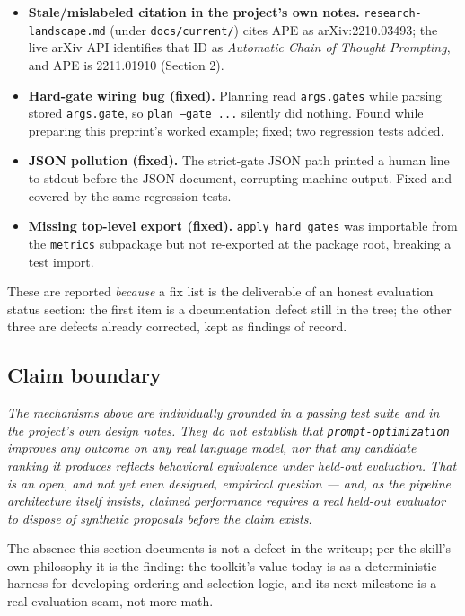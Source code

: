 \begin{itemize}[leftmargin=*]
  \item \textbf{Stale/mislabeled citation in the project's own notes.}
  \texttt{research-landscape.md} (under \texttt{docs/current/}) cites APE as
  arXiv:2210.03493; the
  live arXiv API identifies that ID as \emph{Automatic Chain of Thought
  Prompting}, and APE is 2211.01910 (Section 2).
  \item \textbf{Hard-gate wiring bug (fixed).} Planning read
  \texttt{args.gates} while parsing stored \texttt{args.gate}, so
  \texttt{plan --gate ...} silently did nothing. Found while preparing this
  preprint's worked example; fixed; two regression tests added.
  \item \textbf{JSON pollution (fixed).} The strict-gate JSON path printed a
  human line to stdout before the JSON document, corrupting machine output. Fixed
  and covered by the same regression tests.
  \item \textbf{Missing top-level export (fixed).} \texttt{apply\_hard\_gates}
  was importable from the \texttt{metrics} subpackage but not re-exported at the
  package root, breaking a test import.
\end{itemize}

These are reported \emph{because} a fix list is the deliverable of an honest
evaluation status section: the first item is a documentation defect still in the
tree; the other three are defects already corrected, kept as findings of record.

\subsection{Claim boundary}

\emph{The mechanisms above are individually grounded in a passing test suite and
in the project's own design notes. They do not establish that
\texttt{prompt-optimization} improves any outcome on any real language model, nor
that any candidate ranking it produces reflects behavioral equivalence under
held-out evaluation. That is an open, and not yet even designed, empirical
question --- and, as the pipeline architecture itself insists, claimed performance
requires a real held-out evaluator to dispose of synthetic proposals before the
claim exists.}

The absence this section documents is not a defect in the writeup; per the
skill's own philosophy it is the finding: the toolkit's value today is as a
deterministic harness for developing ordering and selection logic, and its next
milestone is a real evaluation seam, not more math.